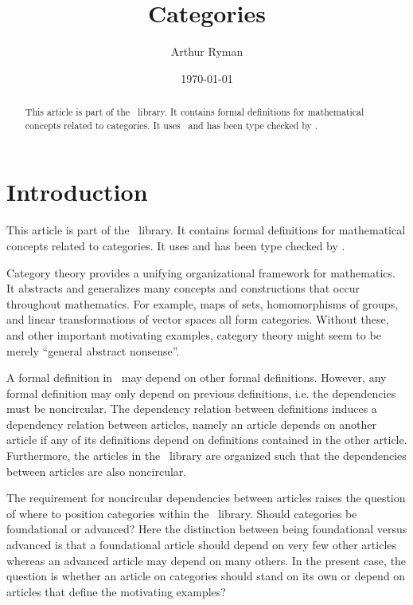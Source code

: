 \documentclass{amsart}
\begin{document}
\title{Categories}
\author{Arthur Ryman}
\date{\today}

\begin{abstract}
    This article is part of the \mathz\ library.
    It contains formal definitions for mathematical concepts related to categories.
    It uses \ZN\ and has been type checked by \fuzz.
\end{abstract}

\maketitle

\tableofcontents

\section*{Introduction}

This article is part of the \mathz\ library.
It contains formal definitions for mathematical concepts related to categories.
It uses \ZN\cite{spivey-zrm} and has been type checked by \fuzz\cite{spivey-fm}.

Category theory provides a unifying organizational framework for mathematics.
It abstracts and generalizes many concepts and constructions that occur throughout mathematics.
For example, maps of sets, homomorphisms of groups, and linear transformations of vector spaces
all form categories.
Without these, and other important motivating examples, category theory might seem to be merely ``general abstract nonsense''.

A formal definition in \ZN\ may depend on other formal definitions.
However, any formal definition may only depend on previous definitions, i.e. the dependencies must be noncircular.
The dependency relation between definitions induces a dependency relation between articles,
namely an article depends on another article if any of its definitions depend on definitions contained in the other article.
Furthermore, the articles in the \mathz\ library are organized such that the dependencies between articles are also noncircular.

The requirement for noncircular dependencies between articles raises the question of where to position categories within the \mathz\ library.
Should categories be foundational or advanced?
Here the distinction between being foundational versus advanced is that a
foundational article should depend on very few other articles whereas an advanced article may depend on many others.
In the present case, the question is whether an article on categories should stand on its own or depend on articles that 
define the motivating examples?
\end{document}
